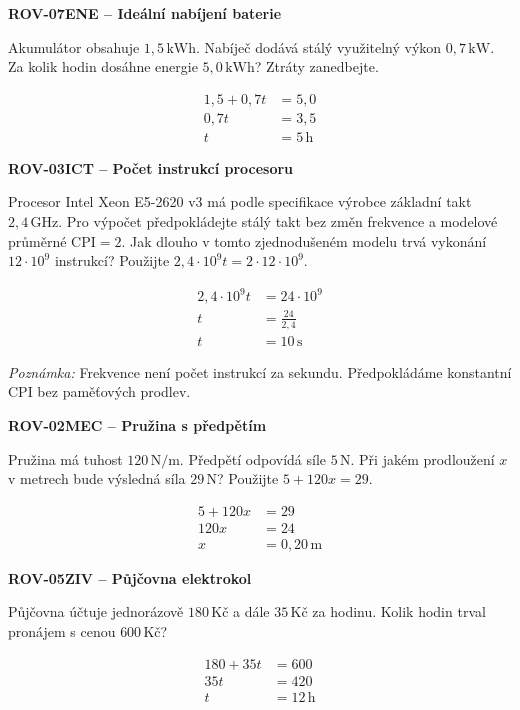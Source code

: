 \documentclass[11pt,a4paper]{article}
\begin{document}
\par\medskip\noindent
\textbf{ROV-07}\quad\textbf{ENE -- Ideální nabíjení baterie}\par
Akumulátor obsahuje $1{,}5\,\mathrm{kWh}$. Nabíječ dodává stálý využitelný výkon $0{,}7\,\mathrm{kW}$. Za kolik hodin dosáhne energie $5{,}0\,\mathrm{kWh}$? Ztráty zanedbejte.
\par\[\begin{aligned}
1{,}5+0{,}7t&=5{,}0\\0{,}7t&=3{,}5\\t&=5\,\mathrm h
\end{aligned}\]
\par\medskip\noindent
\textbf{ROV-03}\quad\textbf{ICT -- Počet instrukcí procesoru}\par
Procesor Intel Xeon E5-2620 v3 má podle specifikace výrobce základní takt $2{,}4\,\mathrm{GHz}$. Pro výpočet předpokládejte stálý takt bez změn frekvence a modelové průměrné $\mathrm{CPI}=2$. Jak dlouho v tomto zjednodušeném modelu trvá vykonání $12\cdot10^9$ instrukcí? Použijte $2{,}4\cdot10^9t=2\cdot12\cdot10^9$.
\par\[\begin{aligned}
2{,}4\cdot10^9t&=24\cdot10^9\\t&=\frac{24}{2{,}4}\\t&=10\,\mathrm s
\end{aligned}\]
\par\textit{Poznámka:} Frekvence není počet instrukcí za sekundu. Předpokládáme konstantní CPI bez paměťových prodlev.
\par\medskip\noindent
\textbf{ROV-02}\quad\textbf{MEC -- Pružina s předpětím}\par
Pružina má tuhost $120\,\mathrm{N/m}$. Předpětí odpovídá síle $5\,\mathrm N$. Při jakém prodloužení $x$ v metrech bude výsledná síla $29\,\mathrm N$? Použijte $5+120x=29$.
\par\[\begin{aligned}
5+120x&=29\\120x&=24\\x&=0{,}20\,\mathrm m
\end{aligned}\]
\par\medskip\noindent
\textbf{ROV-05}\quad\textbf{ZIV -- Půjčovna elektrokol}\par
Půjčovna účtuje jednorázově $180\,\text{Kč}$ a dále $35\,\text{Kč}$ za hodinu. Kolik hodin trval pronájem s cenou $600\,\text{Kč}$?
\par\[\begin{aligned}
180+35t&=600\\35t&=420\\t&=12\,\mathrm h
\end{aligned}\]
\end{document}
